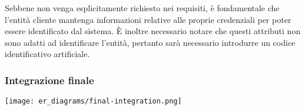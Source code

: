 Sebbene non venga esplicitamente richiesto nei requisiti, è fondamentale che
l'entità cliente mantenga informazioni relative alle proprie credenziali per
poter essere identificato dal sistema.
È inoltre necessario notare che questi attributi non sono adatti ad
identificare l'entità, pertanto sarà necessario introdurre un codice
identificativo artificiale.

\subsubsection*{Integrazione finale}
%
%
\texttt{[image: er\_diagrams/final-integration.png]}

